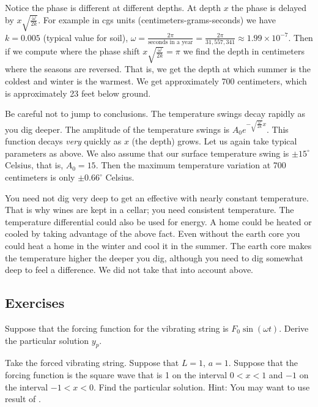 Notice the phase is different at different depths.  At depth $x$ the
phase is delayed by $x \sqrt{\frac{\omega}{2k}}$.
For example in cgs units (centimeters-grams-seconds)
we have $k=0.005$ (typical value for soil),
$\omega = \frac{2\pi}{\text{seconds in a year}}
= \frac{2\pi}{31,557,341} \approx 1.99 \times {10}^{-7}$.   Then
if we compute where the phase shift $x \sqrt{\frac{\omega}{2k}} = \pi$
we find the depth in centimeters where the seasons are reversed.  That is,
we get the depth at which summer is the coldest and winter is the warmest.
We get
approximately 700 centimeters, which is approximately 23 feet below ground.

Be careful not to jump to conclusions.  The temperature swings decay rapidly as you dig deeper.  The
amplitude of the temperature swings is
$A_0 e^{-\sqrt{\frac{\omega}{2k}} x}$.  This function decays \emph{very}
quickly as $x$ (the depth) grows.
Let us again take
typical parameters as above.  We also assume that
our surface temperature swing is $\pm {15}^\circ$ Celsius, that is,
$A_0 = 15$.  Then the maximum temperature variation at 700 centimeters
is only $\pm {0.66}^\circ$ Celsius.

You need not dig very deep to get an effective
 with nearly constant temperature.  That is why wines are kept in a cellar; you need consistent
temperature.
The temperature differential could also be used for energy.  A home could
be heated or cooled by taking advantage of the above fact.
Even without the earth core you could heat a home in the winter and cool it
in the summer.  The earth core makes the
temperature higher the deeper you dig, although you need to dig somewhat
deep to feel a difference.
We did not take that into account above.

\subsection{Exercises}

\begin{exercise} \label{sps:sinforceexr}
Suppose that the forcing function for the vibrating string
is $F_0 \sin (\omega t)$.  Derive the particular solution $y_p$.
\end{exercise}

\begin{exercise}
Take the forced vibrating string.
Suppose that $L=1$, $a=1$.  Suppose that the forcing function
is the square wave that is 1 on the interval $0 < x < 1$ and
$-1$ on the interval $-1 < x< 0$.
Find the particular solution.  Hint: You may want to use result
of .
\end{exercise}


